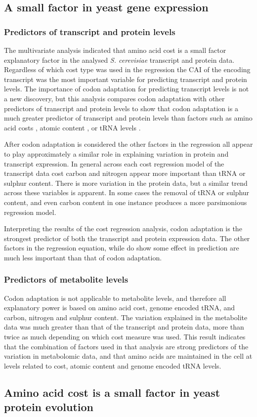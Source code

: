 \subsection{A small factor in yeast gene expression}

\subsubsection{Predictors of transcript and protein levels}

The multivariate analysis indicated that amino acid cost is a small factor explanatory factor in the analysed \emph{S. cerevisiae} transcript and protein data. Regardless of which cost type was used in the regression the CAI of the encoding transcript was the most important variable for predicting transcript and protein levels. The importance of codon adaptation for predicting transcript levels is not a new discovery, but this analysis compares codon adaptation with other predictors of transcript and protein levels to show that codon adaptation is a much greater predictor of transcript and protein levels than factors such as amino acid costs \cite{akashi2002}, atomic content \cite{atomic_content}, or tRNA levels \cite{akashi_trna}.

After codon adaptation is considered the other factors in the regression all appear to play approximately a similar role in explaining variation in protein and transcript expression. In general across each cost regression model of the transcript data cost carbon and nitrogen appear more important than tRNA or sulphur content. There is more variation in the protein data, but a similar trend across these variables is apparent. In some cases the removal of tRNA or sulphur content, and even carbon content in one instance produces a more parsimonious regression model. 

Interpreting the results of the cost regression analysis, codon adaptation is the strongest predictor of both the transcript and protein expression data. The other factors in the regression equation, while do show some effect in prediction are much less important than that of codon adaptation.

\subsubsection{Predictors of metabolite levels}

Codon adaptation is not applicable to metabolite levels, and therefore all explanatory power is based on amino acid cost, genome encoded tRNA, and carbon, nitrogen and sulphur content. The variation explained in the metabolite data was much greater than that of the transcript and protein data, more than twice as much depending on which cost measure was used. This result indicates that the combination of factors used in that analysis are strong predictors of the variation in metabolomic data, and that amino acids are maintained in the cell at levels related to cost, atomic content and genome encoded tRNA levels.

\subsection{Amino acid cost is a small factor in yeast protein evolution}
